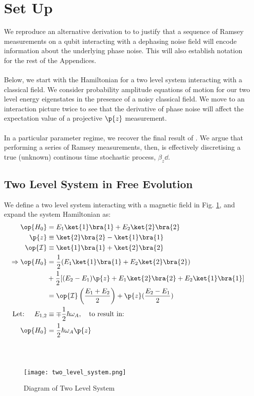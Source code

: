 \section{Set Up}\label{ap:ap_setup}
 We reproduce an alternative derivation to \cite{soare} to justify that a sequence of Ramsey measurements on a qubit interacting with a dephasing noise field will encode information about the underlying phase noise. This will also establish notation for the rest of the Appendices. 
 \\
 \\
Below, we start with the Hamiltonian for a two level system interacting with a classical field. We consider probability amplitude equations of motion for our two level energy eigenstates in the presence of a noisy classical field. We move to an interaction picture twice to see that the derivative of phase noise will affect the expectation value of a projective $\p{z}$ measurement. 
\\
\\
In a particular parameter regime, we recover the final result of \cite{soare}. We argue that performing a series of Ramsey measurements, then, is effectively discretising a true (unknown) continous time stochastic process, $\beta_z \dd $.

\subsection{Two Level System in Free Evolution}

We define a two level system interacting with a magnetic field in Fig. \ref{fig:set_up}, and expand the system Hamiltonian as: 
\\
\begin{align}
\op{H_0} &= E_1\ket{1}\bra{1} + E_2\ket{2}\bra{2} \\
\p{z} &\equiv \ket{2}\bra{2} - \ket{1}\bra{1} \\
\op{\mathcal{I}} & \equiv \ket{1}\bra{1} + \ket{2}\bra{2} \\
\Rightarrow \op{H_0} & = \frac{1}{2} (E_1\ket{1}\bra{1}+ E_2\ket{2}\bra{2}) \\
& + \frac{1}{2} [(E_2 - E_1)\p{z} + E_1 \ket{2}\bra{2} + E_2 \ket{1}\bra{1}]\\
& = \op{\mathcal{I}} \left( \frac{E_1 + E_2}{2} \right) + \p{z}(\frac{E_2 - E_1}{2}) \\
\text{Let: } \quad E_{1,2} &\equiv \mp \frac{1}{2} \hbar \omega_A, \quad \text{to result in:} \\
\op{H_0} &= \frac{1}{2} \hbar \omega_A \p{z}
\end{align}
\\
\\
\begin{figure}[h]
	\centering
	\texttt{[image: two\_level\_system.png]}
	\caption[Setup: Diagram of Two Level System]{Diagram of Two Level System}
	\label{fig:set_up}
\end{figure}
\\
\\
